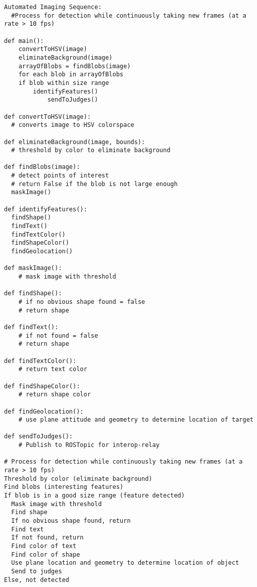 \begin{lstlisting}
Automated Imaging Sequence:
  #Process for detection while continuously taking new frames (at a rate > 10 fps)

def main():
	convertToHSV(image)
	eliminateBackground(image)
	arrayOfBlobs = findBlobs(image)
	for each blob in arrayOfBlobs
	if blob within size range
		identifyFeatures()
			sendToJudges()

def convertToHSV(image):
  # converts image to HSV colorspace

def eliminateBackground(image, bounds):
  # threshold by color to eliminate background

def findBlobs(image):
  # detect points of interest
  # return False if the blob is not large enough
  maskImage()

def identifyFeatures():
  findShape()
  findText()
  findTextColor()
  findShapeColor()
  findGeolocation()

def maskImage():
	# mask image with threshold

def findShape():
	# if no obvious shape found = false
	# return shape

def findText():
	# if not found = false
	# return shape

def findTextColor():
	# return text color

def findShapeColor():
	# return shape color

def findGeolocation():
	# use plane attitude and geometry to determine location of target

def sendToJudges():
	# Publish to ROSTopic for interop-relay

# Process for detection while continuously taking new frames (at a rate > 10 fps)
Threshold by color (eliminate background)
Find blobs (interesting features)
If blob is in a good size range (feature detected)
  Mask image with threshold
  Find shape
  If no obvious shape found, return
  Find text
  If not found, return
  Find color of text
  Find color of shape
  Use plane location and geometry to determine location of object
  Send to judges
Else, not detected
\end{lstlisting}

